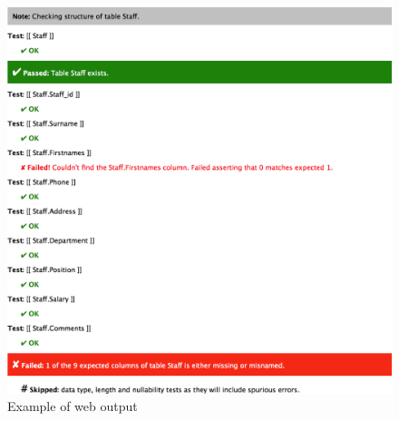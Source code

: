 \documentclass[sigconf, authordraft, capitalise]{acmart}
\begin{document}
\begin{figure}
    \includegraphics[width=0.95\columnwidth,keepaspectratio]{images/web_output.png}
    \caption{Example of web output}
\end{figure}
\end{document}
